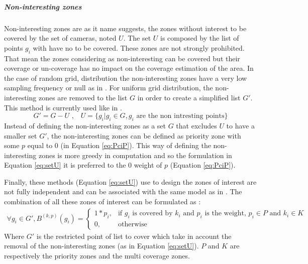 \subparagraph{Non-interesting zones}\label{subsec:obstacleZone}
Non-interesting zones are as it name suggests, the zones without interest to be covered by the set of cameras, noted $U$. The set $U$ is composed by the list of points $g_i$ with have no to be covered. These zones are not strongly prohibited. That mean the zones considering as non-interesting can be covered but their coverage or un-coverage has no impact on the coverage estimation of the area. In the case of random grid, distribution the non-interesting zones have a very low sampling frequency or null as in \citep{141*akbarzadeh2013}. For uniform grid distribution, the non-interesting zones are removed to the list $G$ in order to create a simplified list $G'$. This method is currently used like in \cite{22*zhao2008,170*yabuta2008,141*akbarzadeh2013,171*horster2006,84*xu2011}. 
\begin{equation}\label{eq:setU}
G'=G-U \mbox{ ,    }  \mbox{ }U= \{ g_i | g_i \in G, g_i \mbox{ are the non intresting points} \}
\end{equation}
Instead of defining the non-interesting zones as a set $G$ that excludes $U$ to have a smaller set $G'$, the non-interesting zones can be defined as priority zone with some $p$ equal to $0$ (in Equation \ref{eq:PciP}). This way of defining the non-interesting zones is more greedy in computation and so the formulation in Equation \ref{eq:setU} it is preferred  to the  0 weight of $p$ (Equation \ref{eq:PciP}). 

Finally, these methods (Equation \ref{eq:setU}) use to design the zones of interest are not fully independent and can be associated with the same model as in \cite{141*akbarzadeh2013,171*horster2006,84*xu2011}. The combination of all these zones of interest can be formulated as : 
 \begin{align}\label{eq:PcFull}
\forall g_i \in G', B^{(k,p)}(g_i)= \begin{cases} 1*p_i, & \mbox{if } g_i\mbox{ is covered  by $k_i$ and  $p_i$ is the weight, } p_i \in P \mbox{ and } k_i \in K \\ 0, & \mbox{otherwise}  \end{cases}
\end{align}
Where $G'$ is the restricted point of list to cover which take  in account the removal of the non-interesting zones (as in Equation \ref{eq:setU}). $P$ and $K$ are respectively the priority zones and the  multi coverage zones.
   
